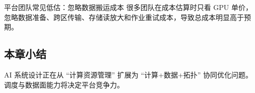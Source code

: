 \begin{warningbox}{平台团队常见低估：忽略数据搬运成本}
很多团队在成本估算时只看 GPU 单价，忽略数据准备、跨区传输、存储读放大和作业重试成本，导致总成本明显高于预期。
\end{warningbox}

\subsection{本章小结}
AI 系统设计正在从 ``计算资源管理'' 扩展为 ``计算+数据+拓扑'' 协同优化问题。调度与数据面能力将决定平台竞争力。

